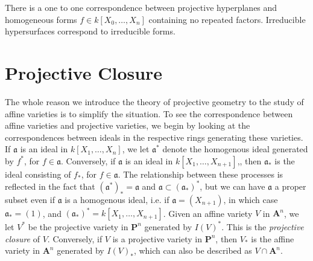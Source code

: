 \begin{corollary}
    There is a one to one correspondence between projective hyperplanes and homogeneous forms $f \in k[X_0,\dots,X_n]$ containing no repeated factors. Irreducible hypersurfaces correspond to irreducible forms.
\end{corollary}

\section{Projective Closure}

The whole reason we introduce the theory of projective geometry to the study of affine varieties is to simplify the situation. To see the correspondence between affine varieties and projective varieties, we begin by looking at the correspondences between ideals in the respective rings generating these varieties. If $\mathfrak{a}$ is an ideal in $k[X_1, \dots, X_n]$, we let $\mathfrak{a}^*$ denote the homogenous ideal generated by $f^*$, for $f \in \mathfrak{a}$. Conversely,  if $\mathfrak{a}$ is an ideal in $k[X_1, \dots, X_{n+1}]$,, then $\mathfrak{a}_*$ is the ideal consisting of $f_*$, for $f \in \mathfrak{a}$. The relationship between these processes is reflected in the fact that $(\mathfrak{a}^*)_* = \mathfrak{a}$ and $\mathfrak{a} \subset (\mathfrak{a}_*)^*$, but we can have $\mathfrak{a}$ a proper subset even if $\mathfrak{a}$ is a homogenous ideal, i.e. if $\mathfrak{a} = (X_{n+1})$, in which case $\mathfrak{a}_* = (1)$, and $(\mathfrak{a}_*)^* = k[X_1, \dots, X_{n+1}]$. Given an affine variety $V$ in $\mathbf{A}^n$, we let $V^*$ be the projective variety in $\mathbf{P}^n$ generated by $I(V)^*$. This is the \emph{projective closure} of $V$. Conversely, if $V$ is a projective variety in $\mathbf{P}^n$, then $V_*$ is the affine variety in $\mathbf{A}^n$ generated by $I(V)_*$, which can also be described as $V \cap \mathbf{A}^n$.

